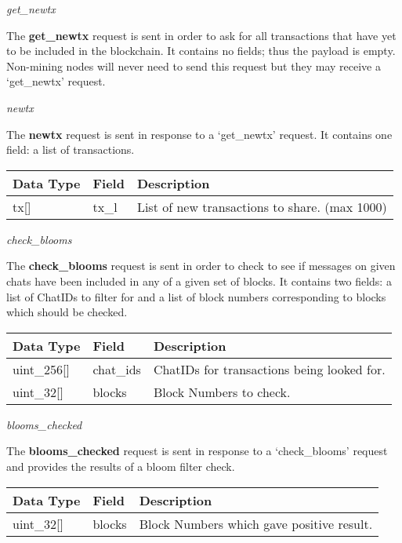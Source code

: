 \documentclass{article}
\begin{document}
\newpage

\begin{center}
    \large \textit{get\_newtx}
\end{center}
The \textbf{get\_newtx} request is sent in order to ask for all transactions that have yet to be included in the blockchain. It contains no fields; thus the payload is empty. Non-mining nodes will never need to send this request but they may receive a `get\_newtx' request.

\begin{center}
    \large \textit{newtx}
\end{center}
The \textbf{newtx} request is sent in response to a `get\_newtx' request. It contains one field: a list of transactions.
\begin{table}[H]
\centering
\begin{tabular}{|p{2.2cm}|p{3cm}|p{5.5cm}|}
\hline
\rowcolor{tblgrey}
Data Type   & Field       & Description\\ \hline
tx[\hspace{0.05cm}] & tx\_l & List of new transactions to share. (max 1000)                  \\ \hline
\end{tabular}
\end{table}

\begin{center}
    \large \textit{check\_blooms}
\end{center}
The \textbf{check\_blooms} request is sent in order to check to see if messages on given chats have been included in any of a given set of blocks. It contains two fields: a list of ChatIDs to filter for and a list of block numbers corresponding to blocks which should be checked.
\begin{table}[H]
\centering
\begin{tabular}{|p{1.6cm}|p{2.5cm}|p{5.5cm}|}
\hline
\rowcolor{tblgrey}
Data Type   & Field       & Description\\ \hline
uint\_256[\hspace{0.05cm}]& chat\_ids    & ChatIDs for transactions being looked for.   \\ \hline
uint\_32[\hspace{0.05cm}] & blocks  & Block Numbers to check.       \\ \hline
\end{tabular}
\end{table}

\begin{center}
    \large \textit{blooms\_checked}
\end{center}
The \textbf{blooms\_checked} request is sent in response to a `check\_blooms' request and provides the results of a bloom filter check.
\begin{table}[H]
\centering
\begin{tabular}{|p{1.5cm}|p{2.5cm}|p{5.5cm}|}
\hline
\rowcolor{tblgrey}
Data Type   & Field       & Description\\ \hline
uint\_32[\hspace{0.05cm}] & blocks  & Block Numbers which gave positive result.       \\ \hline
\end{tabular}
\end{table}
\end{document}
